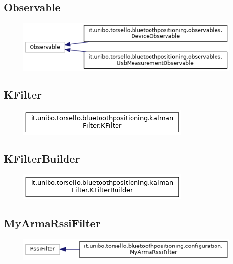 \newpage
\subsection{Observable}
\begin{figure}[ph]
	\centering
	\includegraphics[scale=.55]{img/uml/inherit_graph/inherit_graph_14.png}
	\caption[]{}
\end{figure}

\newpage
\subsection{KFilter}
\begin{figure}[ph]
	\centering
	\includegraphics[scale=.55]{img/uml/inherit_graph/inherit_graph_11.png}
	\caption[]{}
\end{figure}

\newpage
\subsection{KFilterBuilder}
\begin{figure}[ph]
	\centering
	\includegraphics[scale=.55]{img/uml/inherit_graph/inherit_graph_12.png}
	\caption[]{}
\end{figure}

\newpage
\subsection{MyArmaRssiFilter}
\begin{figure}[ph]
	\centering
	\includegraphics[scale=.55]{img/uml/inherit_graph/inherit_graph_4.png}
	\caption[]{}
\end{figure}

